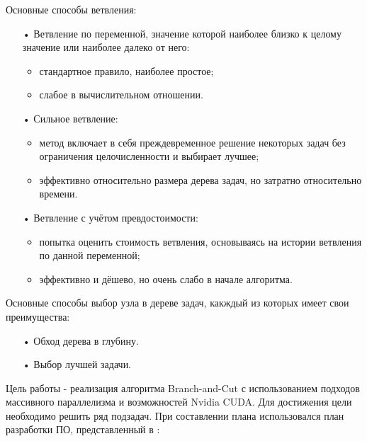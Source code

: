 \documentclass[a4paper,14pt,russian]{extreport}
\begin{document}
\par
Основные способы ветвления:
\begin{itemize}
\item[•] Ветвление по переменной, значение которой наиболее близко к целому значение или наиболее далеко от него:
\begin{itemize}
\item стандартное правило, наиболее простое;
\item слабое в вычислительном отношении.
\end{itemize}
\item[•] Сильное ветвление:
\begin{itemize} 
\item метод включает в себя преждевременное решение некоторых задач без ограничения целочисленности и выбирает лучшее;
\item эффективно относительно размера дерева задач, но затратно относительно времени.
\end{itemize}
\item[•] Ветвление с учётом превдостоимости:
\begin{itemize}
\item попытка оценить стоимость ветвления, основываясь на истории ветвления по данной переменной;
\item эффективно и дёшево, но очень слабо в начале алгоритма.
\end{itemize}
\end{itemize}
\par
Основные способы выбор узла в дереве задач, какждый из которых имеет свои преимущества:
\begin{itemize}
\item[•] Обход дерева в глубину.
\item[•] Выбор лучшей задачи.
\end{itemize}
\par 
Цель работы - реализация алгоритма Branch-and-Cut с использованием подходов массивного параллелизма и возможностей Nvidia CUDA. Для достижения цели необходимо решить ряд подзадач. При составлении плана использовался план разработки ПО, представленный в \cite{mcconnell}: 
\end{document}
